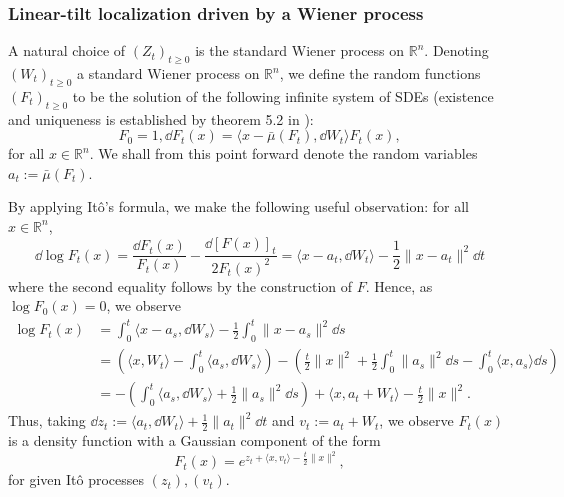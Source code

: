 \subsubsection{Linear-tilt localization driven by a Wiener process}\label{sec:construct}

A natural choice of \((Z_t)_{t \ge 0}\) is the standard Wiener process on \(\mathbb{R}^n\).
Denoting \((W_t)_{t \ge 0}\) a standard Wiener process on \(\mathbb{R}^n\), we define the random functions 
\((F_t)_{t \ge 0}\) to be the solution of the following infinite system of SDEs 
(existence and uniqueness is established by theorem 5.2 in \cite{Øksendal_2003}): 
\begin{equation}\label{eq:stoch_loc}
  F_0 = 1, \dd F_t(x) = \langle x - \bar{\mu}(F_t), \dd W_t \rangle F_t(x),
\end{equation}
for all \(x \in \mathbb{R}^n\). We shall from this point forward denote the random variables \(a_t := \bar{\mu}(F_t)\).

By applying Itô's formula, we make the following useful observation: for all \(x \in \mathbb{R}^n\),
\begin{equation}
  \dd \log F_t(x) = \frac{\dd F_t(x)}{F_t(x)} - \frac{\dd\hspace{0pt} [F(x)]_t}{2F_t(x)^2} 
    = \langle x - a_t, \dd W_t \rangle - \frac{1}{2}\|x - a_t\|^2 \dd t
\end{equation}
where the second equality follows by the construction of \(F\). Hence, as \(\log F_0(x) = 0\), we 
observe
\begin{align*}
  \log F_t(x) & = \int_0^t \langle x - a_s, \dd W_s \rangle - \frac{1}{2}\int_0^t \|x - a_s\|^2 \dd s\\
    & = \left(\langle x, W_t \rangle - \int_0^t \langle a_s, \dd W_s \rangle\right)
      - \left(\frac{t}{2}\|x\|^2 + \frac{1}{2}\int_0^t\|a_s\|^2 \dd s - \int_0^t \langle x, a_s \rangle \dd s\right)\\
    & = - \left(\int_0^t \langle a_s, \dd W_s \rangle + \frac{1}{2}\|a_s\|^2 \dd s\right) + 
      \langle x, a_t + W_t \rangle - \frac{t}{2}\|x\|^2.
\end{align*}
Thus, taking \(\dd z_t := \langle a_t, \dd W_t\rangle + \frac{1}{2} \|a_t\|^2 \dd t\) and 
\(v_t := a_t + W_t\), we observe \(F_t(x)\) is a density function with a Gaussian component of the form
\begin{equation}\label{eq:stoch_loc_alt}
  F_t(x) = e^{z_t + \langle x, v_t \rangle - \frac{t}{2}\|x\|^2},
\end{equation}
for given Itô processes \((z_t), (v_t)\).

